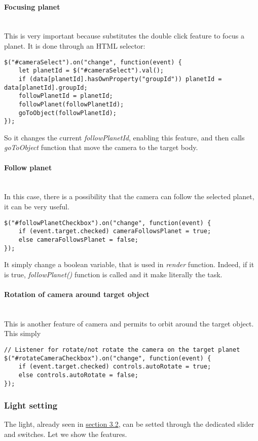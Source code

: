 \documentclass{article}
\begin{document}
\paragraph{Focusing planet}\mbox{}\\
This is very important because substitutes the double click feature to focus a planet. It is done through an HTML selector:
\begin{lstlisting}
$("#cameraSelect").on("change", function(event) {
	let planetId = $("#cameraSelect").val();
	if (data[planetId].hasOwnProperty("groupId")) planetId = data[planetId].groupId;
	followPlanetId = planetId;
	followPlanet(followPlanetId);
	goToObject(followPlanetId);
});
\end{lstlisting}
So it changes the current \textit{followPlanetId}, enabling this feature, and then calls \textit{goToObject} function that move the camera to the target body.

\paragraph{Follow planet}\mbox{}\\
In this case, there is a possibility that the camera can follow the selected planet, it can be very useful.
\begin{lstlisting}
$("#followPlanetCheckbox").on("change", function(event) {
	if (event.target.checked) cameraFollowsPlanet = true;
	else cameraFollowsPlanet = false;
});
\end{lstlisting}
It simply change a boolean variable, that is used in \textit{render} function. Indeed, if it is true, \textit{followPlanet()} function is called and it make literally the task.
\paragraph{Rotation of camera around target object}\mbox{}\\
This is another feature of camera and permits to orbit around the target object. This simply 
\begin{lstlisting}
// Listener for rotate/not rotate the camera on the target planet
$("#rotateCameraCheckbox").on("change", function(event) {
	if (event.target.checked) controls.autoRotate = true;
	else controls.autoRotate = false;
});
\end{lstlisting}

\subsubsection{Light setting}
The light, already seen in \hyperref[light:section]{section 3.2}, can be setted through the dedicated slider and switches. Let we show the features.
\end{document}
